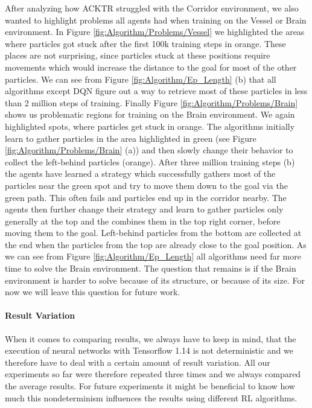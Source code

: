 After analyzing how ACKTR struggled with the Corridor environment, we also wanted to highlight problems all agents had when training on the Vessel or Brain environment. In Figure \ref{fig:Algorithm/Problems/Vessel} we highlighted the areas where particles got stuck after the first 100k training steps in orange. These places are not surprising, since particles stuck at these positions require movements which would increase the distance to the goal for most of the other particles. We can see from Figure \ref{fig:Algorithm/Ep_Length} (b) that all algorithms except DQN figure out a way to retrieve most of these particles in less than 2 million steps of training. Finally Figure \ref{fig:Algorithm/Problems/Brain} shows us problematic regions for training on the Brain environment. We again highlighted spots, where particles get stuck in orange. The algorithms initially learn to gather particles in the area highlighted in green (see Figure \ref{fig:Algorithm/Problems/Brain} (a)) and then slowly change their behavior to collect the left-behind particles (orange). After three million training steps (b) the agents have learned a strategy which successfully gathers most of the particles near the green spot and try to move them down to the goal via the green path. This often fails and particles end up in the corridor nearby. The agents then further change their strategy and learn to gather particles only generally at the top and the combines them in the top right corner, before moving them to the goal. Left-behind particles from the bottom are collected at the end when the particles from the top are already close to the goal position. As we can see from Figure \ref{fig:Algorithm/Ep_Length} all algorithms need far more time to solve the Brain environment. The question that remains is if the Brain environment is harder to solve because of its structure, or because of its size. For now we will leave this question for future work.

\paragraph{Result Variation}
When it comes to comparing results, we always have to keep in mind, that the execution of neural networks with Tensorflow 1.14 is not deterministic and we therefore have to deal with a certain amount of result variation. All our experiments so far were therefore repeated three times and we always compared the average results. For future experiments it might be beneficial to know how much this nondeterminism influences the results using different RL algorithms.

